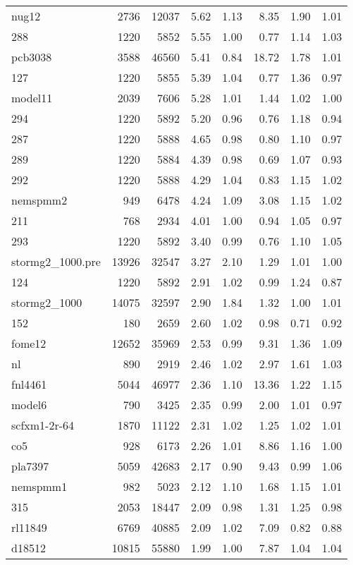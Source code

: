 \documentclass[10pt]{article}
\begin{document}
\begin{longtable}{|l|r|r|r|r|r|r|r|}
nug12	&	2736	&	12037	&	5.62	&	1.13	&	8.35	&	1.90	&	1.01	\\
288	&	1220	&	5852	&	5.55	&	1.00	&	0.77	&	1.14	&	1.03	\\
pcb3038	&	3588	&	46560	&	5.41	&	0.84	&	18.72	&	1.78	&	1.01	\\
127	&	1220	&	5855	&	5.39	&	1.04	&	0.77	&	1.36	&	0.97	\\
model11	&	2039	&	7606	&	5.28	&	1.01	&	1.44	&	1.02	&	1.00	\\
294	&	1220	&	5892	&	5.20	&	0.96	&	0.76	&	1.18	&	0.94	\\
287	&	1220	&	5888	&	4.65	&	0.98	&	0.80	&	1.10	&	0.97	\\
289	&	1220	&	5884	&	4.39	&	0.98	&	0.69	&	1.07	&	0.93	\\
292	&	1220	&	5888	&	4.29	&	1.04	&	0.83	&	1.15	&	1.02	\\
nemspmm2	&	949	&	6478	&	4.24	&	1.09	&	3.08	&	1.15	&	1.02	\\
211	&	768	&	2934	&	4.01	&	1.00	&	0.94	&	1.05	&	0.97	\\
293	&	1220	&	5892	&	3.40	&	0.99	&	0.76	&	1.10	&	1.05	\\
stormg2\_1000.pre	&	13926	&	32547	&	3.27	&	2.10	&	1.29	&	1.01	&	1.00	\\
124	&	1220	&	5892	&	2.91	&	1.02	&	0.99	&	1.24	&	0.87	\\
stormg2\_1000	&	14075	&	32597	&	2.90	&	1.84	&	1.32	&	1.00	&	1.01	\\
152	&	180	&	2659	&	2.60	&	1.02	&	0.98	&	0.71	&	0.92	\\
fome12	&	12652	&	35969	&	2.53	&	0.99	&	9.31	&	1.36	&	1.09	\\
nl	&	890	&	2919	&	2.46	&	1.02	&	2.97	&	1.61	&	1.03	\\
fnl4461	&	5044	&	46977	&	2.36	&	1.10	&	13.36	&	1.22	&	1.15	\\
model6	&	790	&	3425	&	2.35	&	0.99	&	2.00	&	1.01	&	0.97	\\
scfxm1-2r-64	&	1870	&	11122	&	2.31	&	1.02	&	1.25	&	1.02	&	1.01	\\
co5	&	928	&	6173	&	2.26	&	1.01	&	8.86	&	1.16	&	1.00	\\
pla7397	&	5059	&	42683	&	2.17	&	0.90	&	9.43	&	0.99	&	1.06	\\
nemspmm1	&	982	&	5023	&	2.12	&	1.10	&	1.68	&	1.15	&	1.01	\\
315	&	2053	&	18447	&	2.09	&	0.98	&	1.31	&	1.25	&	0.98	\\
rl11849	&	6769	&	40885	&	2.09	&	1.02	&	7.09	&	0.82	&	0.88	\\
d18512	&	10815	&	55880	&	1.99	&	1.00	&	7.87	&	1.04	&	1.04	\\

\end{longtable}
\end{document}
